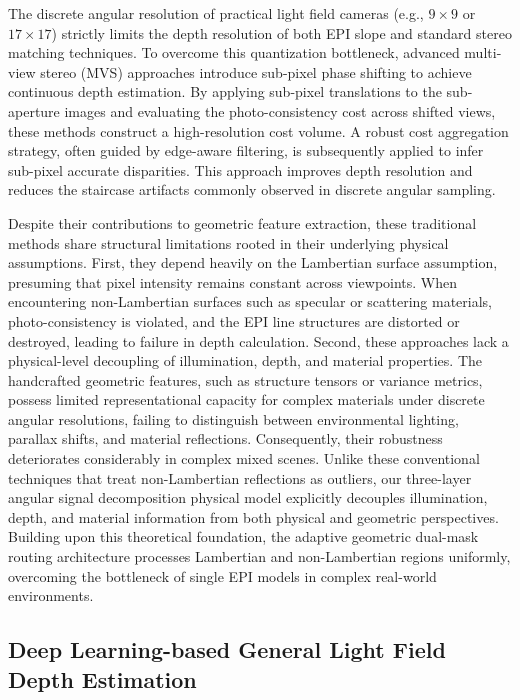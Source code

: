 \documentclass[lettersize,journal]{IEEEtran}
\begin{document}
The discrete angular resolution of practical light field cameras (e.g., $9 \times 9$ or $17 \times 17$) strictly limits the depth resolution of both EPI slope and standard stereo matching techniques. To overcome this quantization bottleneck, advanced multi-view stereo (MVS) approaches introduce sub-pixel phase shifting to achieve continuous depth estimation. By applying sub-pixel translations to the sub-aperture images and evaluating the photo-consistency cost across shifted views, these methods construct a high-resolution cost volume. A robust cost aggregation strategy, often guided by edge-aware filtering, is subsequently applied to infer sub-pixel accurate disparities. This approach improves depth resolution and reduces the staircase artifacts commonly observed in discrete angular sampling.

Despite their contributions to geometric feature extraction, these traditional methods share structural limitations rooted in their underlying physical assumptions. First, they depend heavily on the Lambertian surface assumption, presuming that pixel intensity remains constant across viewpoints. When encountering non-Lambertian surfaces such as specular or scattering materials, photo-consistency is violated, and the EPI line structures are distorted or destroyed, leading to failure in depth calculation. Second, these approaches lack a physical-level decoupling of illumination, depth, and material properties. The handcrafted geometric features, such as structure tensors or variance metrics, possess limited representational capacity for complex materials under discrete angular resolutions, failing to distinguish between environmental lighting, parallax shifts, and material reflections. Consequently, their robustness deteriorates considerably in complex mixed scenes. Unlike these conventional techniques that treat non-Lambertian reflections as outliers, our three-layer angular signal decomposition physical model explicitly decouples illumination, depth, and material information from both physical and geometric perspectives. Building upon this theoretical foundation, the adaptive geometric dual-mask routing architecture processes Lambertian and non-Lambertian regions uniformly, overcoming the bottleneck of single EPI models in complex real-world environments.

\subsection{Deep Learning-based General Light Field Depth Estimation}
\end{document}
